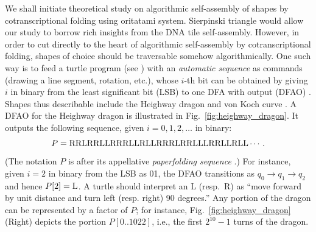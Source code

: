 \documentclass[dvipdfmx,review]{elsarticle}
\begin{document}
We shall initiate theoretical study on algorithmic self-assembly of shapes by cotranscriptional folding using oritatami system. 
Sierpinski triangle would allow our study to borrow rich insights from the DNA tile self-assembly. 
However, in order to cut directly to the heart of algorithmic self-assembly by cotranscriptional folding, shapes of choice should be traversable somehow algorithmically. 
One such way is to feed a turtle program (see \cite{AbelsondiSessa1981}) with an \textit{automatic sequence} as commands (drawing a line segment, rotation, etc.), whose $i$-th bit can be obtained by giving $i$ in binary from the least significant bit (LSB) to one DFA with output (DFAO) \cite{AlloucheShallit2003}.
Shapes thus describable include the Heighway dragon \cite{AlloucheShallit2003} and von Koch curve \cite{MaHoldener2005}. 
A DFAO for the Heighway dragon is illustrated in Fig.~\ref{fig:heighway_dragon}. 
It outputs the following sequence, given $i = 0, 1, 2, \ldots$ in binary: 
\[
P 	= {\rm RRLRRLLRRRLLRLLRRRLRRLLLRRLLRLL} \cdots.
\]
(The notation $P$ is after its appellative \textit{paperfolding sequence} \cite{AlloucheShallit2003}.) 
For instance, given $i = 2$ in binary from the LSB as 01, the DFAO transitions as $q_0 \to q_1 \to q_2$ and hence $P[2] = {\rm L}$. 
A turtle should interpret an L (resp.~R) as ``move forward by unit distance and turn left (resp. right) 90 degrees.''
Any portion of the dragon can be represented by a factor of $P$; for instance, Fig.~\ref{fig:heighway_dragon} (Right) depicts the portion $P[0 .. 1022]$, i.e., the first $2^{10}-1$ turns of the dragon. 
\end{document}
